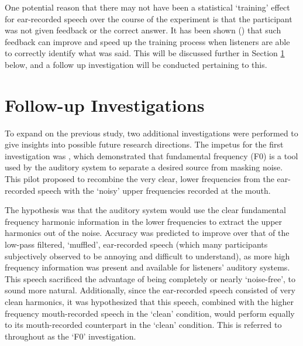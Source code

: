One potential reason that there may not have been a statistical `training' effect for ear-recorded speech over the course of the experiment is that the participant was not given feedback or the correct answer.  It has been shown (\cite{davis:05}) that such feedback can improve and speed up the training process when listeners are able to correctly identify what was said.  This will be discussed further in Section \ref{chap3:follow-up-expts} below, and a follow up investigation will be conducted pertaining to this.


\section{Follow-up Investigations}
\label{chap3:follow-up-expts}

To expand on the previous study, two additional investigations were performed to give insights into possible future research directions.  The impetus for the first investigation was \cite{bird:97}, which demonstrated that fundamental frequency (F0) is a tool used by the auditory system to separate a desired source from masking noise.  This pilot proposed to recombine the very clear, lower frequencies from the ear-recorded speech with the `noisy' upper frequencies recorded at the mouth.  

The hypothesis was that the auditory system would use the clear fundamental frequency harmonic information in the lower frequencies to extract the upper harmonics out of the noise.  Accuracy was predicted to improve over that of the low-pass filtered, `muffled', ear-recorded speech (which many participants subjectively observed to be annoying and difficult to understand), as more high frequency information was present and available for listeners' auditory systems.  This speech sacrificed the advantage of being completely or nearly `noise-free', to sound more natural.  Additionally, since the ear-recorded speech consisted of very clean harmonics, it was hypothesized that this speech, combined with the higher frequency mouth-recorded speech in the `clean' condition, would perform equally to its mouth-recorded counterpart in the `clean' condition. This is referred to throughout as the `F0' investigation.

